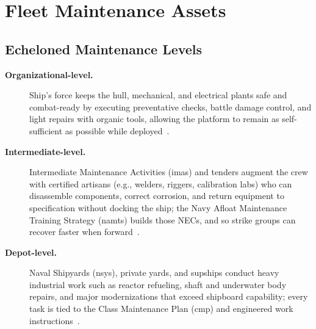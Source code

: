 \documentclass[../main.tex]{subfiles}
\begin{document}
\section{Fleet Maintenance Assets}
\minibib

\subsection{Echeloned Maintenance Levels}
\begin{description}
  \item[\textbf{Organizational-level.}] Ship's force keeps the hull, mechanical, and electrical plants safe and combat-ready by executing preventative checks, battle damage control, and light repairs with organic tools, allowing the platform to remain as self-sufficient as possible while deployed~\autocite{OPNAVINST4700-7M,edo-4-1-1-fleet-maint-assets-2025}.
\item[\textbf{Intermediate-level.}] Intermediate Maintenance Activities (\acp{ima}) and tenders augment the crew with certified artisans (e.g., welders, riggers, calibration labs) who can disassemble components, correct corrosion, and return equipment to specification without docking the ship; the Navy Afloat Maintenance Training Strategy (\ac{namts}) builds those NECs, and so strike groups can recover faster when forward~\autocite{OPNAVINST4700-7M,edo-4-1-1-fleet-maint-assets-2025}.
\item[\textbf{Depot-level.}] Naval Shipyards (\acp{nsy}), private yards, and \acp{supship} conduct heavy industrial work such as reactor refueling, shaft and underwater body repairs, and major modernizations that exceed shipboard capability; every task is tied to the Class Maintenance Plan (\ac{cmp}) and engineered work instructions~\autocite{NAVSEAINST5450-14D,NAVSEAINST5450-145A,edo-4-1-1-fleet-maint-assets-2025}.
\end{description}
\end{document}
